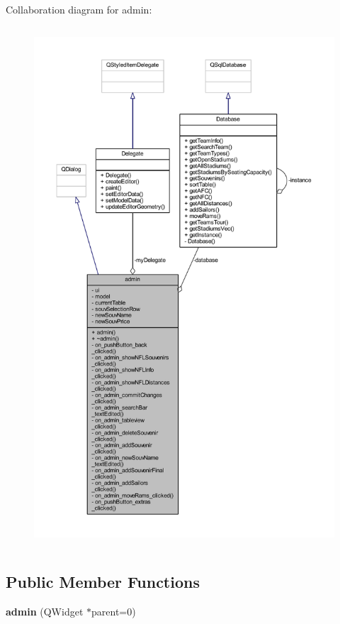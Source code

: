 Collaboration diagram for admin\+:
\nopagebreak
\begin{figure}[H]
\begin{center}
\leavevmode
\includegraphics[height=550pt]{classadmin__coll__graph}
\end{center}
\end{figure}
\subsection*{Public Member Functions}
\begin{DoxyCompactItemize}
\item 
\mbox{\label{classadmin_a6dcec2d7b1f0ccb693397a5a565aef77}} 
{\bfseries admin} (Q\+Widget $\ast$parent=0)
\end{DoxyCompactItemize}
